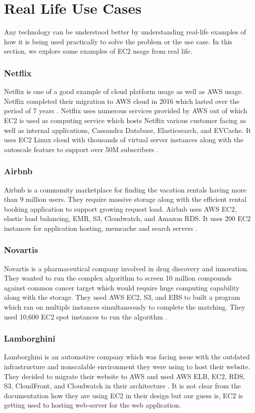\section{Real Life Use Cases}
Any technology can be understood better by understanding real-life examples of how it is being used practically to solve the problem or the use case. In this section, we explore some examples of EC2 usage from real life.

\subsubsection{Netflix}
Netflix is one of a good example of cloud platform usage as well as AWS usage. Netflix completed their migration to AWS cloud in 2016 which lasted over the period of 7 years \cite{www-media-netflix}. Netflix uses numerous services provided by AWS out of which EC2 is used as computing service which hosts Netflix various customer facing as well as internal applications, Cassandra Database, Elasticsearch, and EVCache. It uses EC2 Linux cloud with thousands of virtual server instances along with the autoscale feature to support over 50M subscribers \cite{www-brendangregg}.

\subsubsection{Airbnb}
Airbnb is a community marketplace for finding the vacation rentals having more than 9 million users. They require massive storage along with the efficient rental booking application to support growing request load. Airbnb uses AWS EC2, elastic load balancing, EMR, S3, Cloudwatch, and Amazon RDS. It uses 200 EC2 instances for application hosting, memcache and search servers \cite{www-aws-ec2-airbnb}.

\subsubsection{Novartis}
Novartis is a pharmaceutical company involved in drug discovery and innovation. They wanted to run the complex algorithm to screen 10 million compounds against common cancer target which would require huge computing capability along with the storage. They used AWS EC2, S3, and EBS to built a program which ran on multiple instances simultaneously to complete the matching. They used 10,600 EC2 spot instances to run the algorithm \cite{www-aws-ec2-novartis}.

\subsubsection{Lamborghini}
Lamborghini is an automotive company which was facing issue with the outdated infrastructure and nonscalable environment they were using to host their website. They decided to migrate their website to AWS and used AWS ELB, EC2, RDS, S3, CloudFront, and Cloudwatch in their architecture \cite{www-aws-ec2-lamborghini}. It is not clear from the documentation how they are using EC2 in their design but our guess is, EC2 is getting used to hosting web-server for the web application.

